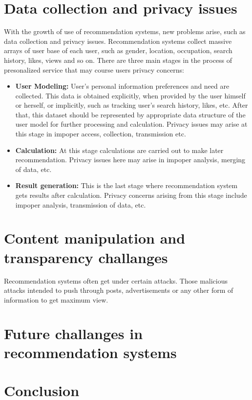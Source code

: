 \documentclass[10pt,twocolumn,twoside,a4paper]{report} %
\begin{document}
\section{Data collection and privacy issues} \label{data_issues}
With the growth of use of recommendation systems, new problems arise, such as data collection and privacy issues.
Recommendation systems collect massive arrays of user base of each user, such as gender, location, occupation, search history, likes, views and so on.
There are three \cite{PrivacyProtectionSurvey} main stages in the process of presonalized service that may course users privacy concerns:
\begin{itemize}
    \item \textbf{User Modeling:} User's personal information preferences and need are collected. This data is obtained explicitly, when provided by the user himself or herself, or implicitly, such as tracking user's search history, likes, etc. After that, this dataset should be represented by appropriate data structure of the user model for further processing and calculation. Privacy issues may arise at this stage in impoper access, collection, transmission etc.
    \item \textbf{Calculation:} At this stage calculations are carried out to make later recommendation. Privacy issues here may arise in impoper analysis, merging of data, etc.
    \item \textbf{Result generation:} This is the last stage where recommendation system gets results after calculation. Privacy concerns arising from this stage include impoper analysis, transmission of data, etc.
\end{itemize}

\section{Content manipulation and transparency challanges} \label{content_manipulation}
Recommendation systems often get under certain attacks. Those malicious attacks intended to push through posts, advertisements or any other form of information
to get maximum view. \cite{propagandasafety}

\section{Future challanges in recommendation systems} \label{content_manipulation}

\section{Conclusion} \label{conclusion}


\nocite{*}

\end{document}
